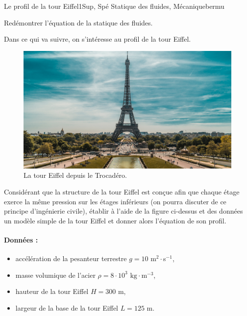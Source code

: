 
\begin{exercise}{Le profil de la tour Eiffel}{1}{Sup, Spé}
{Statique des fluides, Mécanique}{bermu}

\begin{questions}
    \questioncours Redémontrer l'équation de la statique des fluides. 
\begin{EnvUplevel}
Dans ce qui va suivre, on s'intéresse au profil de la tour Eiffel.
\begin{figure}[H]
    \centering
    \includegraphics[width=\linewidth]{mecaflu/statiqueflu/eiffel.png}
    \vspace{-1.5em}
    \caption{La tour Eiffel depuis le Trocadéro.}
\end{figure}
\end{EnvUplevel}
    \question Considérant que la structure de la tour Eiffel est conçue afin que chaque étage exerce la même pression sur les étages inférieurs (on pourra discuter de ce principe d'ingénierie civile), établir à l'aide de la figure ci-dessus et des données un modèle simple de la tour Eiffel et donner alors l'équation de son profil.
\end{questions}

\paragraph{Données :}
\begin{itemize}
    \item accélération de la pesanteur terrestre $g = 10$ m$^2\cdot$s$^{-1}$,
    \item masse volumique de l'acier $\rho = 8\cdot 10^3$ $\mathrm{kg\cdot m^{-3}}$,
    \item hauteur de la tour Eiffel $H = 300$ m,
    \item largeur de la base de la tour Eiffel $L = 125$ m.
\end{itemize}
\end{exercise}